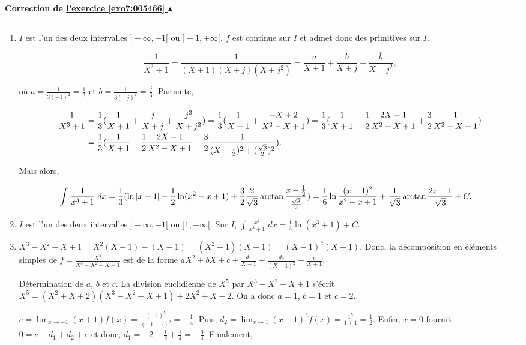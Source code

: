\documentclass[11pt,a4paper]{article}
\newcommand{\Arctan}{\mathop{\mathrm{arctan}}\nolimits}
\newcommand{\noindication}{}
\newcounter{exo}
\newcommand{\correction}[1]{\hypertarget{cor7:#1}{}\label{cor7:#1}{\bf Correction de \hyperlink{exo7:#1}{l'exercice \ref{exo7:#1} $\blacktriangle$}}\vspace{1mm}\hrule\vspace{1mm}}
\begin{document}
\noindication
\noindication
\noindication
\noindication
\noindication
\noindication
\noindication
\noindication
\noindication
\noindication


\newpage

\correction{005466}
\begin{enumerate}
\item  $I$ est l'un des deux intervalles $]-\infty,-1[$ ou $]-1,+\infty[$. $f$ est continue sur $I$ et admet donc des primitives sur $I$.

$$\frac{1}{X^3+1}=\frac{1}{(X+1)(X+j)(X+j^2)}=\frac{a}{X+1}+\frac{b}{X+j}+\frac{\overline{b}}{X+j^2},$$

où $a=\frac{1}{3(-1)^2}=\frac{1}{3}$ et $b=\frac{1}{3(-j)^2}=\frac{j}{3}$. Par suite,

\begin{align*}\ensuremath
\frac{1}{X^3+1}&=\frac{1}{3}(\frac{1}{X+1}+\frac{j}{X+j}+\frac{j^2}{X+j^2})
=\frac{1}{3}(\frac{1}{X+1}+\frac{-X+2}{X^2-X+1})
=\frac{1}{3}(\frac{1}{X+1}-\frac{1}{2}\frac{2X-1}{X^2-X+1}+\frac{3}{2}\frac{1}{X^2-X+1})\\
 &=\frac{1}{3}(\frac{1}{X+1}-\frac{1}{2}\frac{2X-1}{X^2-X+1}
 +\frac{3}{2}\frac{1}{(X-\frac{1}{2})^2+(\frac{\sqrt{3}}{2})^2}).
\end{align*}

Mais alors,

\begin{align*}\ensuremath
\int_{}^{}\frac{1}{x^3+1}\;dx&=\frac{1}{3}(\ln|x+1|-\frac{1}{2}\ln(x^2-x+1)+\frac{3}{2}\frac{2}{\sqrt{3}}\Arctan
\frac{x-\frac{1}{2}}{\frac{\sqrt{3}}{2}})
=\frac{1}{6}\ln\frac{(x-1)^2}{x^2-x+1}+\frac{1}{\sqrt{3}}\Arctan\frac{2x-1}{\sqrt{3}}+C.
\end{align*}

\item  $I$ est l'un des deux intervalles $]-\infty,-1[$ ou $]1,+\infty[$. Sur $I$, $\int_{}^{}\frac{x^2}{x^3+1}\;dx=\frac{1}{3}\ln(x^3+1)+C$.

\item  $X^3-X^2-X+1=X^2(X-1)-(X-1)=(X^2-1)(X-1)=(X-1)^2(X+1)$. Donc, la décomposition en éléments simples de $f=\frac{X^5}{X^3-X^2-X+1}$ est de la forme $aX^2+bX+c+\frac{d_1}{X-1}+\frac{d_2}{(X-1)^2}+\frac{e}{X+1}$.

Détermination de $a$, $b$ et $c$. La division euclidienne de $X^5$ par $X^3-X^2-X+1$ s'écrit $X^5=(X^2+X+2)(X^3-X^2-X+1)+2X^2+X-2$. On a donc $a=1$, $b=1$ et $c=2$.

$e=\lim_{x\rightarrow -1}(x+1)f(x)=\frac{(-1)^5}{(-1-1)^2}=-\frac{1}{4}$. Puis, $d_2=\lim_{x\rightarrow 1}(x-1)^2f(x)=\frac{1^5}{1+1}=\frac{1}{2}$. Enfin, $x=0$ fournit $0=c-d_1+d_2+e$ et donc, $d_1=-2-\frac{1}{2}+\frac{1}{4}=-\frac{9}{4}$. Finalement,


\end{enumerate}
\end{document}
